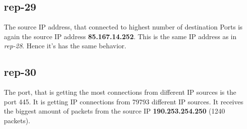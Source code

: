 \subsection*{rep-29}
The source IP address, that connected to highest number of destination Ports is again the source IP address \textbf{85.167.14.252}. This is the same IP address as in \textit{rep-28}. Hence it's has the same behavior.

\subsection*{rep-30}
The port, that is getting the most connections from different IP sources is the port 445. It is getting IP connections from 79793 different IP sources. It receives the biggest amount of packets from the source IP \textbf{190.253.254.250} (1240 packets). \\



